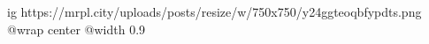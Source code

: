  
 
 
 
 

\ifcmt
  ig https://mrpl.city/uploads/posts/resize/w/750x750/y24ggteoqbfypdts.png
  @wrap center
  @width 0.9
\fi
